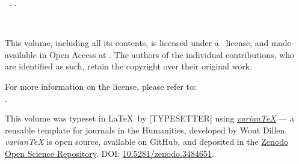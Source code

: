 \null\vfill\small
\noindent\thejournal \ \thevolume. \thejournalsubtitle. \\ \par
\noindent\doclicenseIcon \ \theyear \\ \par 
\noindent This volume, including all its contents, is licensed under a \doclicenseLongNameRef \ license, and made available in Open Access at \href{\thewebsite}{\thewebsite}. The authors of the individual contributions, who are identified as such, retain the copyright over their original work.  \\ \par
\noindent For more information on the \doclicenseNameRef license, please refer to: \\ \doclicenseURL.  \\ \par

\noindent This volume was typeset in \LaTeX~by [TYPESETTER] using \emph{\href{https://variantex.woutdillen.be}{varianTeX}} --- a reusable template for journals in the Humanities, developed by Wout Dillen. \emph{varianTeX} is open source, available on GitHub, and deposited in the \href{https://about.zenodo.org}{Zenodo Open Science Repository}. DOI: \href{https://zenodo.org/record/3484651#.X0PdDy2w3kI}{10.5281/zenodo.3484651}.  
\newpage